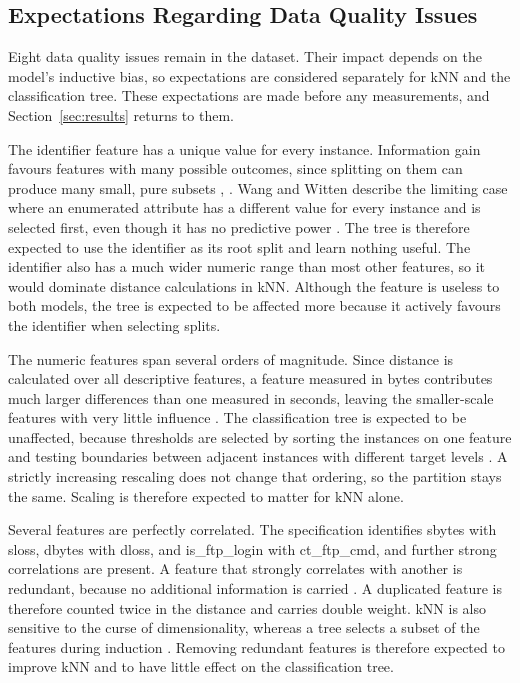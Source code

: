 \documentclass[conference]{IEEEtran}
\begin{document}
\subsection{Expectations Regarding Data Quality Issues}
\label{sec:expectations}

Eight data quality issues remain in the dataset. Their impact depends on the 
model's inductive bias, so expectations are considered separately for kNN and 
the classification tree. These expectations are made before any measurements, 
and Section~\ref{sec:results} returns to them.

The identifier feature has a unique value for every instance. Information gain 
favours features with many possible outcomes, since splitting on them can 
produce many small, pure subsets \cite{topic4}, \cite{kelleher2015}. Wang and 
Witten describe the limiting case where an enumerated attribute has a different 
value for every instance and is selected first, even though it has no 
predictive power \cite{wang1997}. The tree is therefore expected to use the 
identifier as its root split and learn nothing useful. The identifier also has 
a much wider numeric range than most other features, so it would dominate 
distance calculations in kNN. Although the feature is useless to both models, 
the tree is expected to be affected more because it actively favours the 
identifier when selecting splits.

The numeric features span several orders of magnitude. Since distance is
calculated over all descriptive features, a feature measured in bytes
contributes much larger differences than one measured in seconds, leaving the
smaller-scale features with very little influence \cite{topic3,kelleher2015}.
The classification tree is expected to be unaffected, because thresholds are
selected by sorting the instances on one feature and testing boundaries between
adjacent instances with different target levels \cite{kelleher2015}. A strictly
increasing rescaling does not change that ordering, so the partition stays the
same. Scaling is therefore expected to matter for kNN alone.

Several features are perfectly correlated. The specification identifies sbytes
with sloss, dbytes with dloss, and is\_ftp\_login with ct\_ftp\_cmd, and
further strong correlations are present. A feature that strongly correlates
with another is redundant, because no additional information is carried
\cite{kelleher2015}. A duplicated feature is therefore counted twice in the
distance and carries double weight. kNN is also sensitive to the curse of
dimensionality, whereas a tree selects a subset of the features during
induction \cite{kelleher2015}. Removing redundant features is therefore
expected to improve kNN and to have little effect on the classification tree.
\end{document}

